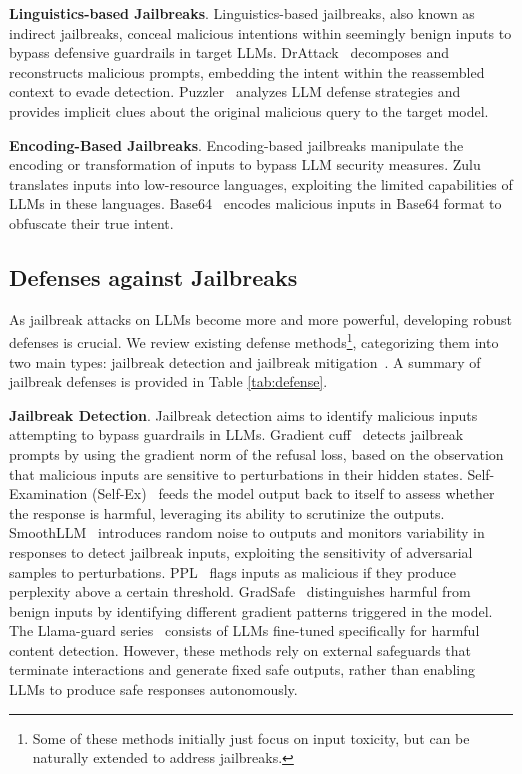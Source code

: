 \noindent\textbf{Linguistics-based Jailbreaks}. Linguistics-based jailbreaks, also known as indirect jailbreaks, conceal malicious intentions within seemingly benign inputs to bypass defensive guardrails in target LLMs. DrAttack~\cite{drattack} decomposes and reconstructs malicious prompts, embedding the intent within the reassembled context to evade detection. Puzzler~\cite{puzzler} analyzes LLM defense strategies and provides implicit clues about the original malicious query to the target model.

\noindent\textbf{Encoding-Based Jailbreaks}. Encoding-based jailbreaks manipulate the encoding or transformation of inputs to bypass LLM security measures. Zulu~\cite{zulu} translates inputs into low-resource languages, exploiting the limited capabilities of LLMs in these languages. Base64~\cite{base64} encodes malicious inputs in Base64 format to obfuscate their true intent.



\subsection{Defenses against Jailbreaks}

As jailbreak attacks on LLMs become more and more powerful, developing robust defenses is crucial. We review existing defense methods\footnote{Some of these methods initially just focus on input toxicity, but can be naturally extended to address jailbreaks.}, categorizing them into two main types: jailbreak detection and jailbreak mitigation~\cite{safedecoding}. A summary of jailbreak defenses is provided in Table \ref{tab:defense}.

\noindent\textbf{Jailbreak Detection}. 
Jailbreak detection aims to identify malicious inputs attempting to bypass guardrails in LLMs. Gradient cuff~\cite{gradientcuff} detects jailbreak prompts by using the gradient norm of the refusal loss, based on the observation that malicious inputs are sensitive to perturbations in their hidden states. Self-Examination (Self-Ex)~\cite{Self-Examination} feeds the model output back to itself to assess whether the response is harmful, leveraging its ability to scrutinize the outputs. SmoothLLM~\cite{smoothllm} introduces random noise to outputs and monitors variability in responses to detect jailbreak inputs, exploiting the sensitivity of adversarial samples to perturbations. PPL~\cite{ppl} flags inputs as malicious if they produce perplexity above a certain threshold. GradSafe~\cite{gradsafe} distinguishes harmful from benign inputs by identifying different gradient patterns triggered in the model. The Llama-guard series~\cite{llamaguard} consists of LLMs fine-tuned specifically for harmful content detection. However, these methods rely on external safeguards that terminate interactions and generate fixed safe outputs, rather than enabling LLMs to produce safe responses autonomously.

